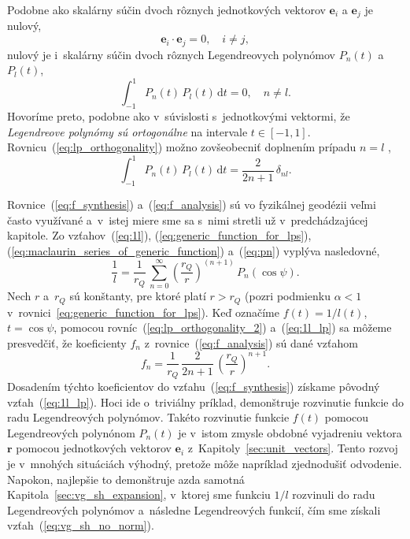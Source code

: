 \documentclass[a4paper,12pt]{book}
\newcommand{\diff}{\mathrm d}
\let\vec\mathbf
\begin{document}
Podobne ako skalárny súčin dvoch rôznych jednotkových vektorov $\vec e_i$ 
a $ \vec e_j$ je nulový,
%
\begin{equation}
\label{eq:ei_orthogonality}
\vec e_i \cdot \vec e_j = 0{,} \quad i \neq j{,}
\end{equation}
%
nulový je i~skalárny súčin dvoch rôznych Legendreovych polynómov $P_n(t)$ 
a $P_l(t)$,
%
\begin{equation}
\label{eq:lp_orthogonality}
\int_{-1}^1 P_n(t) \, P_l(t) \, \diff t = 0{,} \quad n \neq l{.}
\end{equation}
%
Hovoríme preto, podobne ako v~súvislosti s~jednotkovými vektormi, že
\emph{Legendreove polynómy sú ortogonálne} na intervale $t \in [-1, 1].$
Rovnicu~(\ref{eq:lp_orthogonality}) možno zovšeobecniť doplnením prípadu $n
= l$ \parencite[napríklad][]{Hobson},
%
\begin{equation}
\label{eq:lp_orthogonality_2}
\int_{-1}^1 P_n(t) \, P_l(t) \, \diff t = \frac{2}{2n + 1} \, \delta_{nl}{.}
\end{equation}

Rovnice~(\ref{eq:f_synthesis}) a~(\ref{eq:f_analysis}) sú vo fyzikálnej
geodézii veľmi často využívané a~v~istej miere sme sa s~nimi stretli už
v~predchádzajúcej kapitole.  Zo vzťahov~(\ref{eq:1l}),
(\ref{eq:generic_function_for_lps}),
(\ref{eq:maclaurin_series_of_generic_function}) a~(\ref{eq:pn}) vyplýva
nasledovné,
%
\begin{equation}
\label{eq:1l_lp}
\frac{1}{l} = \frac{1}{r_Q} \, \sum_{n = 0}^\infty \left( \frac{r_Q}{r}
\right)^{(n + 1)} \, P_n(\cos\psi){.}
\end{equation}
%
Nech $r$ a~$r_Q$ sú konštanty, pre ktoré platí $r > r_Q$ (pozri podmienku
$\alpha < 1$ v~rovnici~\ref{eq:generic_function_for_lps}).  Keď označíme $f(t)
= 1 \slash l(t)$, $t = \cos\psi$, pomocou rovníc~(\ref{eq:lp_orthogonality_2})
a~(\ref{eq:1l_lp}) sa môžeme presvedčiť, že koeficienty $f_n$
z~rovnice~(\ref{eq:f_analysis}) sú dané vzťahom
%
\begin{equation}
f_n = \frac{1}{r_Q} \, \frac{2}{2n + 1} \, \left( \frac{r_Q}{r} \right)^{n
+ 1}{.}
\end{equation}
%
Dosadením týchto koeficientov do vzťahu~(\ref{eq:f_synthesis}) získame pôvodný 
vzťah~(\ref{eq:1l_lp}).  Hoci ide o~triviálny príklad, demonštruje rozvinutie 
funkcie do radu Legendreových polynómov.  Takéto rozvinutie funkcie $f(t)$ 
pomocou Legendreových polynónom $P_n(t)$ je v~istom zmysle obdobné vyjadreniu 
vektora $\vec r$ pomocou jednotkových vektorov $\vec e_i$ 
z~Kapitoly~\ref{sec:unit_vectors}.  Tento rozvoj je v~mnohých situáciách 
výhodný, pretože môže napríklad zjednodušiť odvodenie.  Napokon, najlepšie to 
demonštruje azda samotná Kapitola~\ref{sec:vg_sh_expansion}, v~ktorej sme 
funkciu $1 \slash l$ rozvinuli do radu Legendreových polynómov a~následne 
Legendreových funkcií, čím sme získali vzťah~(\ref{eq:vg_sh_no_norm}).
\end{document}
